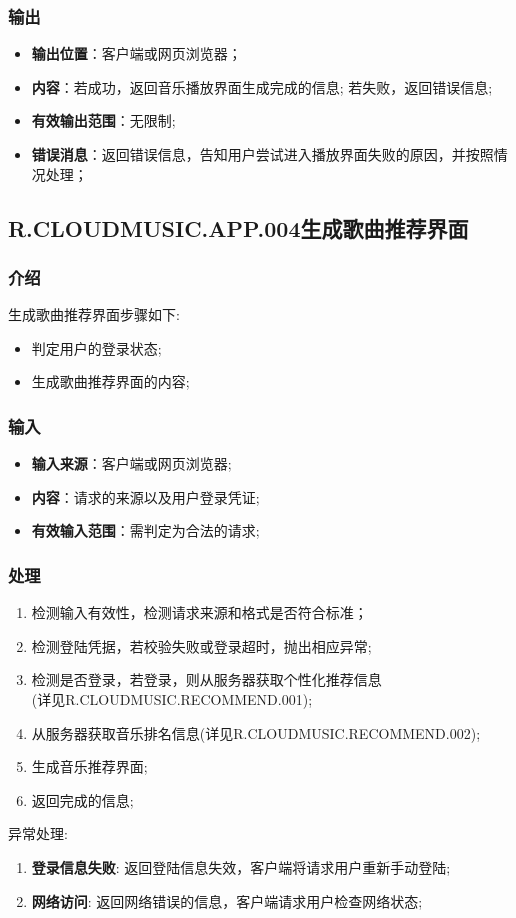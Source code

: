 \subsubsection{输出}
\begin{itemize}
	\item \textbf{输出位置}：客户端或网页浏览器；
	\item \textbf{内容}：若成功，返回音乐播放界面生成完成的信息; 若失败，返回错误信息;
	\item \textbf{有效输出范围}：无限制;
	\item \textbf{错误消息}：返回错误信息，告知用户尝试进入播放界面失败的原因，并按照情况处理；
\end{itemize}

\subsection{R.CLOUDMUSIC.APP.004生成歌曲推荐界面}
\subsubsection{介绍}
生成歌曲推荐界面步骤如下: 
	\begin{itemize}
		\item 判定用户的登录状态;
		\item 生成歌曲推荐界面的内容;
	\end{itemize}
\subsubsection{输入}
	\begin{itemize}
		\item \textbf{输入来源}：客户端或网页浏览器;
		\item \textbf{内容}：请求的来源以及用户登录凭证;
		\item \textbf{有效输入范围}：需判定为合法的请求;
	\end{itemize}
\subsubsection{处理}
	\begin{enumerate}
		\item 检测输入有效性，检测请求来源和格式是否符合标准；
		\item 检测登陆凭据，若校验失败或登录超时，抛出相应异常;
		\item 检测是否登录，若登录，则从服务器获取个性化推荐信息
			\\(详见R.CLOUDMUSIC.RECOMMEND.001);
		\item 从服务器获取音乐排名信息(详见R.CLOUDMUSIC.RECOMMEND.002);
		\item 生成音乐推荐界面;
		\item 返回完成的信息;
	\end{enumerate}
	\noindent 异常处理: 
	\begin{enumerate}
		\item \textbf{登录信息失败}: 返回登陆信息失效，客户端将请求用户重新手动登陆;
		\item \textbf{网络访问}: 返回网络错误的信息，客户端请求用户检查网络状态;
	\end{enumerate}
